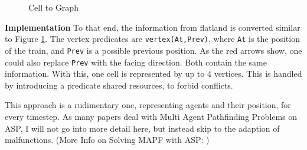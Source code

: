 \begin{figure}
\begin{minipage}[t]{0.45\textwidth}
    \centering
    \caption{Cell to Graph}
    \label{fig:graph}
\end{minipage}
\end{figure}

\noindent \textbf{Implementation} To that end, the information from flatland is converted similar to Figure \ref{fig:graph}. The vertex predicates are \texttt{vertex(At,Prev)}, where \texttt{At} is the position of the train, and \texttt{Prev} is a possible previous position. As the red arrows show, one could also replace \texttt{Prev} with the facing direction. Both contain the same information. With this, one cell is represented by up to 4 vertices. This is handled by introducing a predicate shared resources, to forbid conflicts.

This approach is a rudimentary one, representing agents and their position, for every timestep. As many papers deal with Multi Agent Pathfinding Problems on ASP, I will not go into more detail here, but instead skip to the adaption of malfunctions. (More Info on Solving MAPF with ASP: \cite{MAPF})\\


